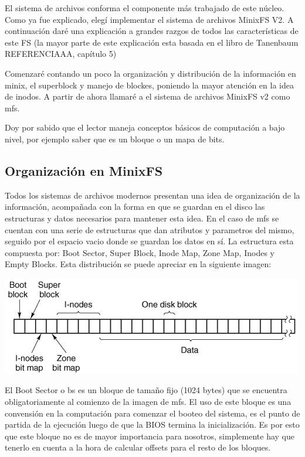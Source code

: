 El sistema de archivos conforma el componente más trabajado de este núcleo. Como
ya fue explicado, elegí implementar el sistema de archivos MinixFS V2. A
continuación daré una explicación a grandes razgos de todos las características
de este FS (la mayor parte de este explicación esta basada en el libro de
Tanenbaum REFERENCIAAA, capítulo 5)

Comenzaré contando un poco la organización y distribución de la información en
minix, el superblock y manejo de blockes, poniendo la mayor atención en la idea
de inodos. A partir de ahora llamaré a el sistema de archivos MinixFS v2 como
mfs.

Doy por sabido que el lector maneja conceptos básicos de computación a bajo
nivel, por ejemplo saber que es un bloque o un mapa de bits.

\subsection{Organización en MinixFS}

Todos los sistemas de archivos modernos presentan una idea de organización de la
información, acompañada con la forma en que se guardan en el disco las
estructuras y datos necesarios para mantener esta idea. En el caso de mfs se
cuentan con una serie de estructuras que dan atributos y parametros del mismo,
seguido por el espacio vacio donde se guardan los datos en sí. La estructura
esta compuesta por: Boot Sector, Super Block, Inode Map, Zone Map, Inodes y Empty
Blocks. Esta distribución se puede apreciar en la siguiente imagen:

\begin{center}
\includegraphics[scale=0.5]{../img/layout.png}
\end{center}

El Boot Sector o bs es un bloque de tamaño fijo (1024 bytes) que se encuentra
obligatoriamente al comienzo de la imagen de mfs. El uso de este bloque es una
convensión en la computación para comenzar el booteo del sistema, es el punto de
partida de la ejecución luego de que la BIOS termina la inicialización. Es por
esto que este bloque no es de mayor importancia para nosotros, simplemente hay
que tenerlo en cuenta a la hora de calcular offsets para el resto de los
bloques.

